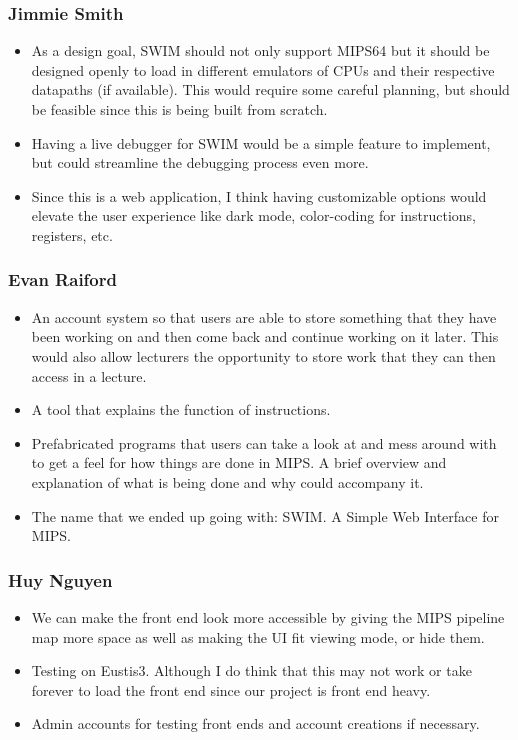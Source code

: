 \documentclass[
    paper=letter,
    parskip=half,
    fontsize=12pt,
    titlepage=firstiscover,
    toc=bibliography,
    numbers=endperiod
]{scrartcl}
\begin{document}
\subsubsection{Jimmie Smith}
\begin{itemize}
    \item As a design goal, SWIM should not only support MIPS64 but it should be
          designed openly to load in different emulators of CPUs and their
          respective datapaths (if available). This would require some careful
          planning, but should be feasible since this is being built from scratch.
    \item Having a live debugger for SWIM would be a simple feature to implement,
          but could streamline the debugging process even more.
    \item Since this is a web application, I think having customizable options
          would elevate the user experience like dark mode, color-coding for
          instructions, registers, etc.
\end{itemize}

\subsubsection{Evan Raiford}
\begin{itemize}
    \item An account system so that users are able to store something that they
          have been working on and then come back and continue working on it
          later. This would also allow lecturers the opportunity to store work
          that they can then access in a lecture.
    \item A tool that explains the function of instructions.
    \item Prefabricated programs that users can take a look at and mess around
          with to get a feel for how things are done in MIPS. A brief overview and
          explanation of what is being done and why could accompany it.
    \item The name that we ended up going with: SWIM. A Simple Web Interface for
          MIPS.
\end{itemize}

\subsubsection{Huy Nguyen}
\begin{itemize}
    \item We can make the front end look more accessible by giving the MIPS
          pipeline map more space as well as making the UI fit viewing mode, or
          hide them.
    \item Testing on Eustis3. Although I do think that this may not work or take
          forever to load the front end since our project is front end heavy.
    \item Admin accounts for testing front ends and account creations if
          necessary.
\end{itemize}
\end{document}
